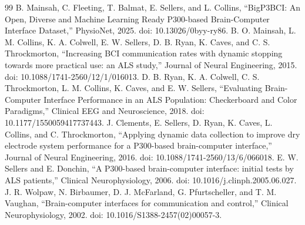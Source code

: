 \begin{thebibliography}{99}
 B. Mainsah, C. Fleeting, T. Balmat, E. Sellers, and L. Collins, ``BigP3BCI: An Open, Diverse and Machine Learning Ready P300-based Brain-Computer Interface Dataset,'' PhysioNet, 2025. doi: 10.13026/0byy-ry86.
 B. O. Mainsah, L. M. Collins, K. A. Colwell, E. W. Sellers, D. B. Ryan, K. Caves, and C. S. Throckmorton, ``Increasing BCI communication rates with dynamic stopping towards more practical use: an ALS study,'' Journal of Neural Engineering, 2015. doi: 10.1088/1741-2560/12/1/016013.
 D. B. Ryan, K. A. Colwell, C. S. Throckmorton, L. M. Collins, K. Caves, and E. W. Sellers, ``Evaluating Brain-Computer Interface Performance in an ALS Population: Checkerboard and Color Paradigms,'' Clinical EEG and Neuroscience, 2018. doi: 10.1177/1550059417737443.
 J. Clements, E. Sellers, D. Ryan, K. Caves, L. Collins, and C. Throckmorton, ``Applying dynamic data collection to improve dry electrode system performance for a P300-based brain-computer interface,'' Journal of Neural Engineering, 2016. doi: 10.1088/1741-2560/13/6/066018.
 E. W. Sellers and E. Donchin, ``A P300-based brain-computer interface: initial tests by ALS patients,'' Clinical Neurophysiology, 2006. doi: 10.1016/j.clinph.2005.06.027.
 J. R. Wolpaw, N. Birbaumer, D. J. McFarland, G. Pfurtscheller, and T. M. Vaughan, ``Brain-computer interfaces for communication and control,'' Clinical Neurophysiology, 2002. doi: 10.1016/S1388-2457(02)00057-3.
\end{thebibliography}
